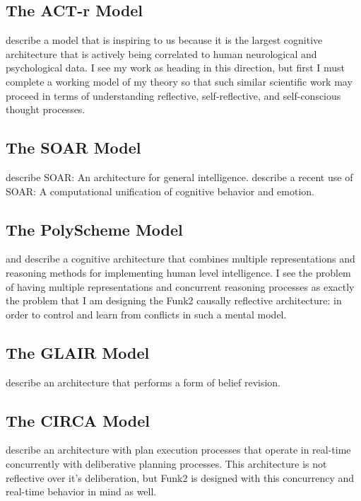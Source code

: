 \subsection{The ACT-r Model}

\cite{anderson:2004} describe a model that is inspiring to us because it is the largest cognitive architecture that is actively being correlated to human neurological and psychological data.
I see my work as heading in this direction, but first I must complete a working model of my theory so that such similar scientific work may proceed in terms of understanding reflective, self-reflective, and self-conscious thought processes.

\subsection{The SOAR Model}

\cite{laird:1987} describe SOAR: An architecture for general intelligence.
\cite{marinier:2009} describe a recent use of SOAR: A computational unification of cognitive behavior and emotion.

\subsection{The PolyScheme Model}

\cite{cassimatis:2004} and \cite{cassimatis:2006} describe a cognitive architecture that combines multiple representations and reasoning methods for implementing human level intelligence.
I see the problem of having multiple representations and concurrent reasoning processes as exactly the problem that I am designing the Funk2 causally reflective architecture: in order to control and learn from conflicts in such a mental model.

\subsection{The GLAIR Model}

\cite{shapiro:2003} describe an architecture that performs a form of belief revision.

\subsection{The CIRCA Model}

\cite{musliner:2001} describe an architecture with plan execution processes that operate in real-time concurrently with deliberative planning processes.
This architecture is not reflective over it's deliberation, but Funk2 is designed with this concurrency and real-time behavior in mind as well.

